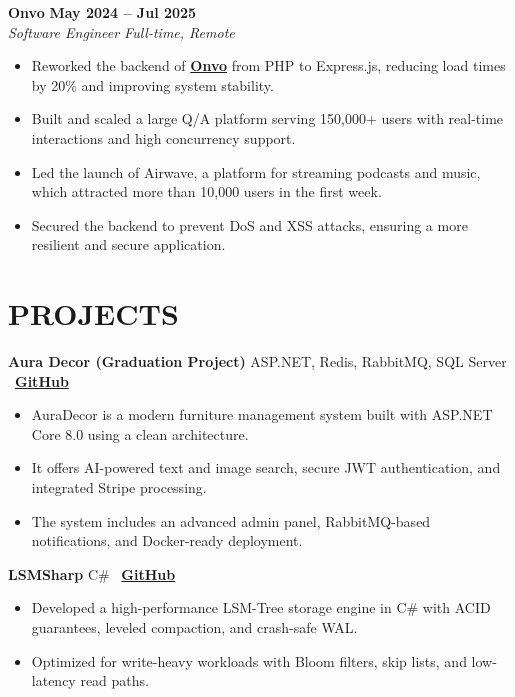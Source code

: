 \documentclass[letterpaper, 11pt]{article}
\begin{document}
\textbf{Onvo} \hfill \textbf{May 2024 -- Jul 2025} \\
\textit{Software Engineer \textbar{} Full-time, Remote}
\begin{itemize}[leftmargin=1.5em, nosep, itemsep=0.1em]
  \item Reworked the backend of \href{https://onvo.me/}{\textbf{Onvo}} from PHP to Express.js, reducing load times by 20\% and improving system stability.
   \item Built and scaled a large Q/A platform serving 150{,}000+ users with real-time interactions and high concurrency support.
  \item Led the launch of Airwave, a platform for streaming podcasts and music, which attracted more than 10,000 users in the first week.
  \item Secured the backend to prevent DoS and XSS attacks, ensuring a more resilient and secure application.
\end{itemize}






\section{PROJECTS}
\vspace{0.5em}

\textbf{Aura Decor (Graduation Project) \textbar{}} ASP.NET, Redis, RabbitMQ, SQL Server
\hfill \faGithub~\textbf{\href{https://github.com/Mo7ammedd/Aura-Decor}{GitHub}} \\
\vspace{-0.6em}
\begin{itemize}[leftmargin=1.5em, nosep, itemsep=0.15em]
    \item AuraDecor is a modern furniture management system built with ASP.NET Core 8.0 using a clean architecture.
    \item It offers AI-powered text and image search, secure JWT authentication, and integrated Stripe processing.
    \item The system includes an advanced admin panel, RabbitMQ-based notifications, and Docker-ready deployment.
\end{itemize}

\vspace{0.6em}
\textbf{LSMSharp \textbar{}} C\#
\hfill \faGithub~\textbf{\href{https://github.com/Mo7ammedd/LSMSharp}{GitHub}} \\
\vspace{-0.6em}
\begin{itemize}[leftmargin=1.5em, nosep, itemsep=0.15em]
    \item Developed a high-performance LSM-Tree storage engine in C\# with ACID guarantees, leveled compaction, and crash-safe WAL.
    \item Optimized for write-heavy workloads with Bloom filters, skip lists, and low-latency read paths.
\end{itemize}
\end{document}
